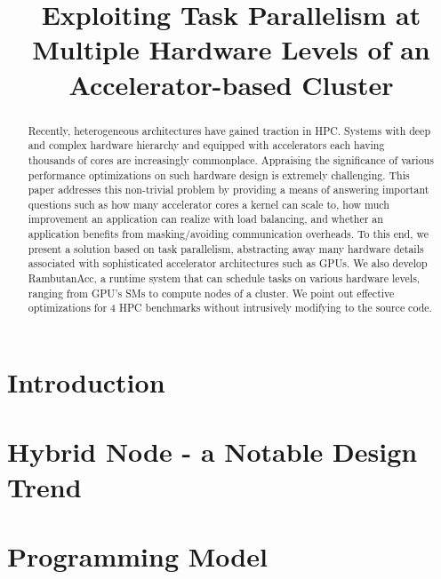 \documentclass[sigconf]{acmart}
\begin{document}
\title{Exploiting Task Parallelism at Multiple Hardware Levels of an Accelerator-based Cluster}


\begin{abstract}
Recently, heterogeneous architectures have gained traction in HPC. Systems with deep and complex hardware hierarchy and equipped with accelerators each having thousands of cores are increasingly commonplace. Appraising the significance of various performance optimizations on such hardware design is extremely challenging. This paper addresses this non-trivial problem by providing a means of answering important questions such as how many accelerator cores a kernel can scale to, how much improvement an application can realize with load balancing, and whether an application benefits from masking/avoiding communication overheads. To this end, we present a solution based on task parallelism, abstracting away many hardware details associated with sophisticated accelerator architectures such as GPUs. We also develop RambutanAcc, a runtime system that can schedule tasks on various hardware levels, ranging from GPU's SMs to compute nodes of a cluster. We point out effective optimizations for 4 HPC benchmarks without intrusively modifying to the source code.
\end{abstract}

\maketitle

\section{Introduction}
\label{sec:intro}


\section{Hybrid Node - a Notable Design Trend}
\label{sec:motivation}


\section{Programming Model}
\label{sec:model}

\end{document}
